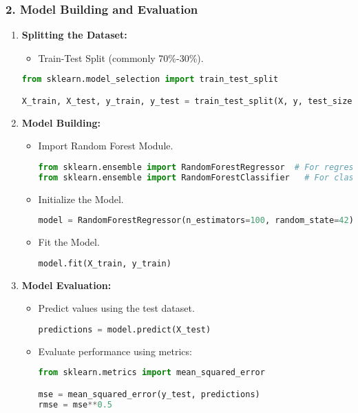 \documentclass[aspectratio=169]{beamer}
\begin{document}
\begin{frame}[fragile]
    \frametitle{2. Model Building and Evaluation}
    \begin{enumerate}
        \item \textbf{Splitting the Dataset:}
        \begin{itemize}
            \item Train-Test Split (commonly 70\%-30\%).
            \end{itemize}
            \begin{lstlisting}[language=Python]
from sklearn.model_selection import train_test_split

X_train, X_test, y_train, y_test = train_test_split(X, y, test_size=0.3, random_state=42)
            \end{lstlisting}
        
        \item \textbf{Model Building:}
        \begin{itemize}
            \item Import Random Forest Module.
            \begin{lstlisting}[language=Python]
from sklearn.ensemble import RandomForestRegressor  # For regression
from sklearn.ensemble import RandomForestClassifier   # For classification
            \end{lstlisting}
            \item Initialize the Model.
            \begin{lstlisting}[language=Python]
model = RandomForestRegressor(n_estimators=100, random_state=42)  # Example for regression
            \end{lstlisting}
            \item Fit the Model.
            \begin{lstlisting}[language=Python]
model.fit(X_train, y_train)
            \end{lstlisting}
        \end{itemize}
        
        \item \textbf{Model Evaluation:}
        \begin{itemize}
            \item Predict values using the test dataset.
            \begin{lstlisting}[language=Python]
predictions = model.predict(X_test)
            \end{lstlisting}
            \item Evaluate performance using metrics:
            \begin{lstlisting}[language=Python]
from sklearn.metrics import mean_squared_error

mse = mean_squared_error(y_test, predictions)
rmse = mse**0.5
            \end{lstlisting}
        \end{itemize}
    \end{enumerate}
\end{frame}
\end{document}
